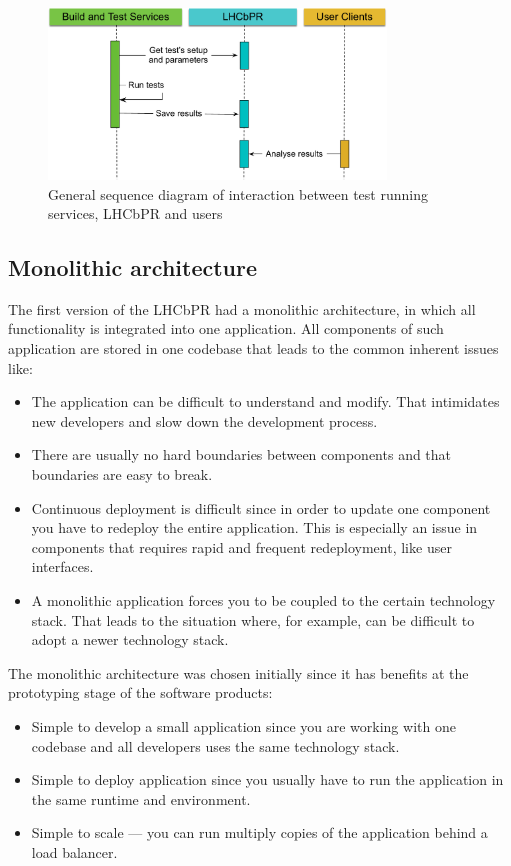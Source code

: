 \documentclass[a4paper]{jpconf}
\begin{document}
\begin{figure}[H]
\begin{minipage}{\textwidth}
\centering
\includegraphics[width=0.8\textwidth]{figs/lhcbpr-general.pdf}
\caption{\label{fig01} General sequence diagram of interaction between test
running services, LHCbPR and users}
\end{minipage}
\end{figure}

\subsection{Monolithic architecture}
The first version of the LHCbPR had a monolithic architecture, in which all
functionality is integrated into one application. All components of
such application are stored in one codebase that leads to the common inherent
issues like:
\begin{itemize}
\item The application can be difficult to understand and modify. That
intimidates new developers and slow down the development process.
\item There are usually no hard boundaries between components and that
boundaries are easy to break.
\item Continuous deployment is difficult since in order to update one component
you have to redeploy the entire application. This is especially an issue in
components that requires rapid and frequent redeployment, like user interfaces.
\item A monolithic application forces you to be coupled to the certain
technology stack. That leads to the situation where, for example, can be
difficult to adopt a newer technology stack.
\end{itemize}

The monolithic architecture was chosen initially since it has benefits at the
prototyping stage of the software products:
\begin{itemize}
\item Simple to develop a small application since you are working with one codebase
and all developers uses the same technology stack.  
\item Simple to deploy application since you usually have to run the application in the same
runtime and environment.
\item Simple to scale --- you can run multiply copies of the application behind a
load balancer.
\end{itemize}
\end{document}
